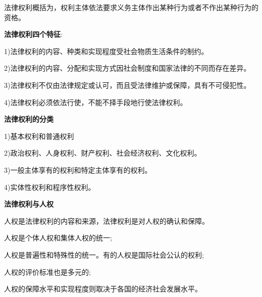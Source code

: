 {法律权利}{概括为，}{权利主体依法要求义务主体作出某种行为或者不作出某种行为的资格}{。}

{\textbf{法律权利四个特征}}{:}

{1)}{法律权利的内容、种类和实现程度受社会物质生活条件的制约。}{}

{2)}{法律权利的内容、分配和实现方式因社会制度和国家法律的不同而存在差异。}

{3)}{法律权利不仅由法律规定或认可，而且受法律维护或保障，具有不可侵犯性。}

{4)}{法律权利必须依法行使，不能不择手段地行使法律权利。}

{\textbf{法律权利的分类}}

{1)}{基本权利和普通权利}{}

{2)}{政治权利、人身权利、财产权利、社会经济权利、文化权利。}

{3)}{一般主体享有的权利和特定主体享有的权利。}

{4)}{实体性权利和程序性权利。}

{\textbf{法律权利与人权}}

{人权是法律权利的内容和来源，法律权利是对人权的确认和保障。}

{人权是个体人权和集体人权的统一}{;}

{人权是普遍性和特殊性的统一。有的人权是国际社会公认的权利;}

{{人权的评价标准也是多元的}{}{;}}

{{人权的保障水平和实现程度则取决于各国的经济社会发展水平。}{}\\
}
